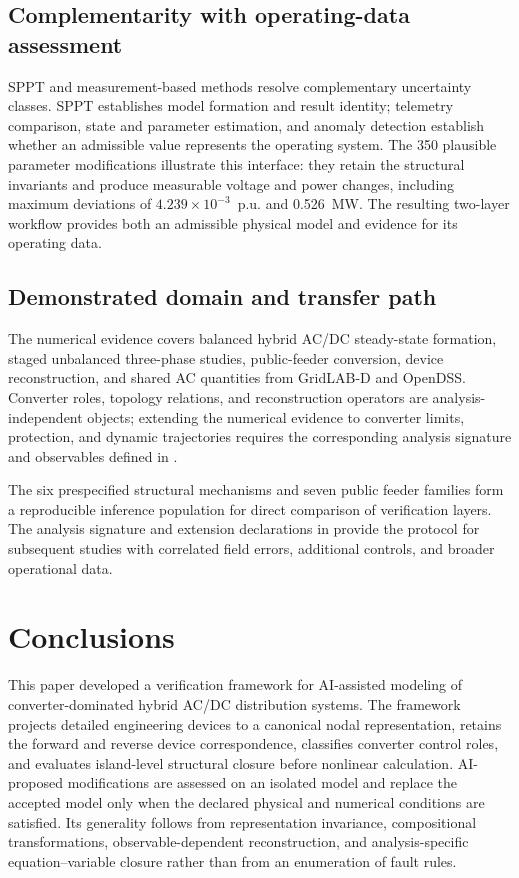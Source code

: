 \documentclass[final,5p,times,twocolumn]{elsarticle}
\begin{document}
\subsection{Complementarity with operating-data assessment}

SPPT and measurement-based methods resolve complementary uncertainty classes.
SPPT establishes model formation and result identity; telemetry comparison,
state and parameter estimation, and anomaly detection establish whether an
admissible value represents the operating system. The 350 plausible parameter
modifications illustrate this interface: they retain the structural invariants
and produce measurable voltage and power changes, including maximum deviations
of $4.239\times10^{-3}$~p.u. and 0.526~MW. The resulting two-layer workflow
provides both an admissible physical model and evidence for its operating data.

\subsection{Demonstrated domain and transfer path}

The numerical evidence covers balanced hybrid AC/DC steady-state formation,
staged unbalanced three-phase studies, public-feeder conversion, device
reconstruction, and shared AC quantities from GridLAB-D and OpenDSS. Converter
roles, topology relations, and reconstruction operators are analysis-independent
objects; extending the numerical evidence to converter limits, protection, and
dynamic trajectories requires the corresponding analysis signature and
observables defined in .

The six prespecified structural mechanisms and seven public feeder families
form a reproducible inference population for direct comparison of verification
layers. The analysis signature and extension declarations in
 provide the protocol for subsequent studies with
correlated field errors, additional controls, and broader operational data.

\section{Conclusions}\label{sec:conclusion}

This paper developed a verification framework for AI-assisted modeling of
converter-dominated hybrid AC/DC distribution systems. The framework projects
detailed engineering devices to a canonical nodal representation, retains the
forward and reverse device correspondence, classifies converter control roles,
and evaluates island-level structural closure before nonlinear calculation.
AI-proposed modifications are assessed on an isolated model and replace the
accepted model only when the declared physical and numerical conditions are
satisfied. Its generality follows from representation invariance, compositional
transformations, observable-dependent reconstruction, and analysis-specific
equation--variable closure rather than from an enumeration of fault rules.
\end{document}
